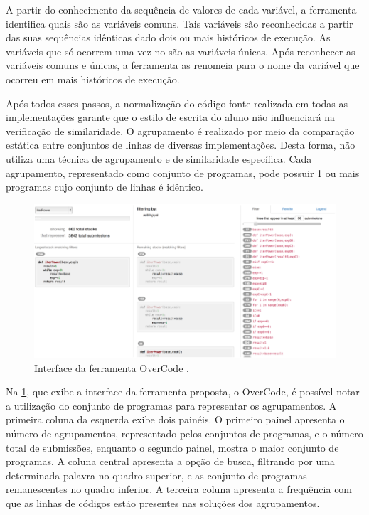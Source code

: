 		A partir do conhecimento da sequência de valores de cada variável, a ferramenta
		identifica quais são as variáveis comuns. Tais variáveis são reconhecidas a
		partir das suas sequências idênticas dado dois ou mais históricos de execução.
		As variáveis que só ocorrem uma vez no  são as variáveis únicas.
		Após reconhecer as variáveis comuns e únicas, a ferramenta as renomeia para o
		nome da variável que ocorreu em mais históricos de execução.
		
		Após todos esses passos, a normalização do código-fonte realizada em todas as
		implementações garante que o estilo de escrita do aluno não influenciará na
		verificação de similaridade. O agrupamento é realizado por meio da comparação
		estática entre conjuntos de linhas de diversas implementações. Desta forma, não
		utiliza uma técnica de agrupamento e de similaridade específica. Cada agrupamento,
		representado como conjunto de programas, pode possuir 1 ou mais programas cujo
		conjunto de linhas é idêntico.
		
		\begin{figure}[ht]
			\centering
			\includegraphics[scale=0.4]{imagem/overCode.png}
			\caption[Interface da ferramenta OverCode]{Interface da ferramenta OverCode \cite{Glassman:2015}.}
			\label{fig:interfaceOverCode}
		\end{figure}
		
		Na \cref{fig:interfaceOverCode}, que exibe a interface da ferramenta proposta,
		o OverCode, é possível notar a utilização do conjunto de programas para
		representar os agrupamentos. A primeira coluna da esquerda exibe dois painéis.
		O primeiro painel apresenta o número de agrupamentos, representado pelos conjuntos de programas,
		e o número total de submissões, enquanto o segundo painel, mostra o maior
		conjunto de programas. A coluna central apresenta a opção de busca, filtrando
		por uma determinada palavra no quadro superior, e as conjunto de programas remanescentes no
		quadro inferior. A terceira coluna apresenta a frequência com que as linhas
		de códigos estão presentes nas soluções dos agrupamentos.

